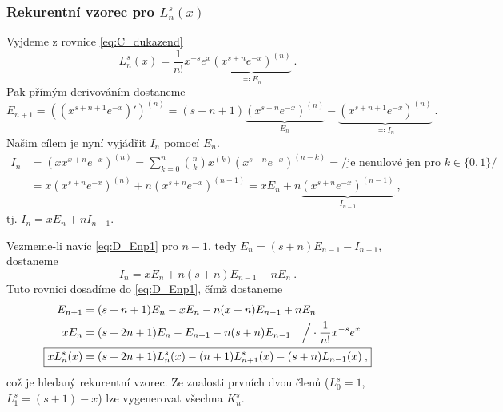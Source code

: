 \subsubsection{Rekurentní vzorec pro $L^s_n(x)$}
Vyjdeme z rovnice \ref{eq:C_dukazend}
$$L_n^s(x)=\frac{1}{n!}x^{-s}e^x\underbrace{\left(x^{s+n}e^{-x}\right)^{(n)}}_{\eqqcolon E_n}\:.$$
Pak přímým derivováním dostaneme
\begin{equation}
    E_{n+1} = \left( \left(x^{s+n+1}e^{-x}\right)'\right)^{(n)}= (s+n+1)\underbrace{\left(x^{s+n}e^{-x}\right)^{(n)}}_{E_n} - \underbrace{\left(x^{s+n+1}e^{-x}\right)^{(n)}}_{\eqqcolon I_n}\:.
    \label{eq:D_Enp1}
\end{equation}
Našim cílem je nyní vyjádřit $I_n$ pomocí $E_n$.
\begin{align*}
    I_n &= \left(x x^{x+n}e^{-x}\right)^{(n)} = \sum\limits_{k=0}^n\binom{n}{k} x^{(k)}(x^{s+n}e^{-x})^{(n-k)} = \big/\text{je nenulové jen pro }k\in\{0,1\}\big/ \\
    &= x\left(x^{s+n}e^{-x}\right)^{(n)} + n\left(x^{s+n}e^{-x}\right)^{(n-1)} = xE_n+ n \underbrace{(x^{s+n}e^{-x})^{(n-1)}}_{I_{n-1}}\:,
\end{align*}
tj. $I_n = xE_n+n I_{n-1}$.

Vezmeme-li navíc \ref{eq:D_Enp1} pro $n-1$, tedy $E_n=(s+n)E_{n-1}-I_{n-1}$, dostaneme $$I_n = xE_n + n(s+n)E_{n-1}-n E_n\:.$$ 
Tuto rovnici dosadíme do \ref{eq:D_Enp1}, čímž dostaneme
\begin{align*}
    E_{n+1} &= (s+n+1)E_n - xE_n-n(x+n)E_{n-1} + nE_n\\
    x E_n &= (s+2n+1)E_n-E_{n+1} - n(s+n)E_{n-1} \quad \Big/\cdot \frac{1}{n!}x^{-s}e^x\\
    \Aboxed{ xL_n^s(x) &= (s+2n+1)L_n^s(x) - (n+1)L^s_{n+1}(x)-(s+n)L_{n-1}(x)\:,}
\end{align*}
což je hledaný rekurentní vzorec. Ze znalosti prvních dvou členů ($L_0^s=1$, $L_1^s=(s+1)-x$) lze vygenerovat všechna $K_n^s$.


